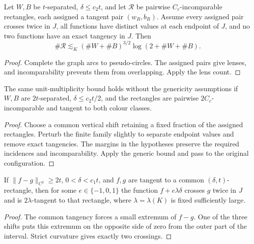 \begin{lemma}
\label{lem:generic-bipartite}
Let $W,B$ be $t$-separated, $\delta\leq c_2t$, and let
$\mathcal R$ be pairwise $C_c$-incomparable rectangles,
each assigned a tangent pair $(w_R,b_R)$. Assume every
assigned pair crosses twice in $J$, all functions have
distinct values at each endpoint of $J$, and no two
functions have an exact tangency in $J$. Then
\[
                \#\mathcal R\lesssim_K
                (\#W+\#B)^{3/2}\log(2+\#W+\#B).
\]
\end{lemma}
\begin{proof}
Complete the graph arcs to pseudo-circles. The assigned
pairs give lenses, and incomparability prevents them from
overlapping. Apply the lens count.
\end{proof}

\begin{lemma}
\label{lem:bipartite-perturbation}
The same unit-multiplicity bound holds without the
genericity assumptions if $W,B$ are $2t$-separated,
$\delta\leq c_2t/2$, and the rectangles are pairwise
$2C_c$-incomparable and tangent to both colour classes.
\end{lemma}
\begin{proof}
Choose a common vertical shift retaining a fixed fraction
of the assigned rectangles. Perturb the finite family
slightly to separate endpoint values and remove exact
tangencies. The margins in the hypotheses preserve the
required incidences and incomparability. Apply the generic
bound and pass to the original configuration.
\end{proof}

\begin{lemma}
\label{lem:two-crossing-shift}
If $\|f-g\|_{C^2}\geq2t$, $0<\delta<c_1t$, and
$f,g$ are tangent to a common $(\delta,t)$-rectangle,
then for some $e\in\{-1,0,1\}$ the function
$f+e\lambda\delta$ crosses $g$ twice in $J$ and is
$2\lambda$-tangent to that rectangle, where
$\lambda=\lambda(K)$ is fixed sufficiently large.
\end{lemma}
\begin{proof}
The common tangency forces a small extremum of $f-g$.
One of the three shifts puts this extremum on the opposite
side of zero from the outer part of the interval. Strict
curvature gives exactly two crossings.
\end{proof}

